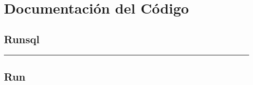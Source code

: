 \documentclass[letterpaper,10pt,spanish]{sphinxmanual}
\begin{document}
\chapter{Documentación del Código}
\label{\detokenize{documentos/codigo:documentacion-del-codigo}}\label{\detokenize{documentos/codigo::doc}}

\section{Runsql}
\label{\detokenize{documentos/codigo:runsql}}

\bigskip\hrule\bigskip



\section{Run}
\label{\detokenize{documentos/codigo:run}}


\renewcommand{\indexname}{Índice}
\printindex
\end{document}
